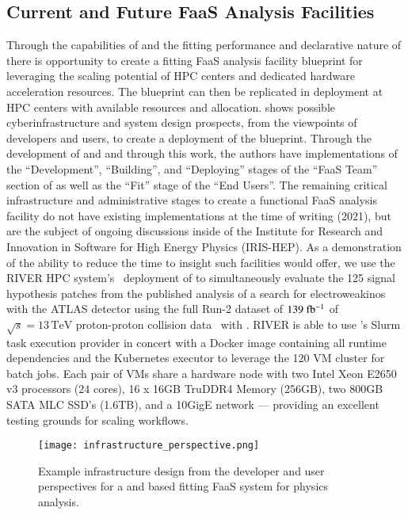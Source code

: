 \subsection{Current and Future FaaS Analysis Facilities}\label{subsec:FaaS_analysis_facilities}

Through the capabilities of \funcX{} and the fitting performance and declarative nature of \pyhf{} there is opportunity to create a fitting FaaS analysis facility blueprint for leveraging the scaling potential of HPC centers and dedicated hardware acceleration resources.
The blueprint can then be replicated in deployment at HPC centers with available resources and allocation.
 shows possible cyberinfrastructure and system design prospects, from the viewpoints of developers and users, to create a deployment of the blueprint.
Through the development of \pyhf{} and \funcX{} and through this work, the authors have implementations of the ``Development'', ``Building'', and ``Deploying'' stages of the ``FaaS Team'' section of  as well as the ``Fit'' stage of the ``End Users''.
The remaining critical infrastructure and administrative stages to create a functional FaaS analysis facility do not have existing implementations at the time of writing (2021), but are the subject of ongoing discussions inside of the Institute for Research and Innovation in Software for High Energy Physics (IRIS-HEP).
As a demonstration of the ability to reduce the time to insight such facilities would offer, we use the RIVER HPC system's~\cite{RIVER_HPC} deployment of \funcX{} to simultaneously evaluate the 125 signal hypothesis patches from the published analysis of a search for electroweakinos with the ATLAS detector using the full Run-2 dataset of \(139~\ifb\) of \(\sqrt{s} = 13\,\text{TeV}\) proton-proton collision data~\cite{SUSY-2019-08} with \pyhf{}.
RIVER is able to use \funcX{}'s Slurm task execution provider in concert with a Docker image containing all runtime dependencies and the Kubernetes \funcX{} executor to leverage the 120 VM cluster for batch jobs.
Each pair of VMs share a hardware node with two Intel Xeon E2650 v3 processors (24 cores), 16 x 16GB TruDDR4 Memory (256GB), two 800GB SATA MLC SSD's (1.6TB), and a 10GigE network --- providing an excellent testing grounds for scaling workflows.

\begin{figure}[!htpb]
    \centering
    \texttt{[image: infrastructure\_perspective.png]}
    \caption{Example infrastructure design from the developer and user perspectives for a \pyhf{} and \funcX{} based fitting FaaS system for physics analysis.~\cite{portable_inference_workshop}}
    \label{fig:infrastructure_perspective}
\end{figure}
